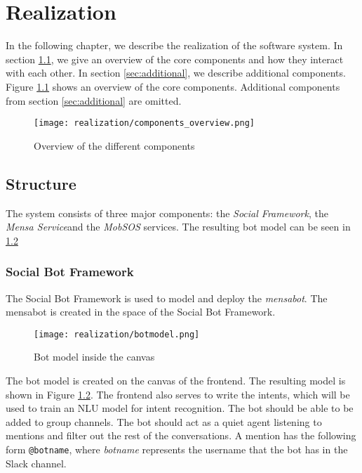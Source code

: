 \chapter{Realization}
In the following chapter, we describe the realization of the software system. In section \ref{sec:structure}, we give an overview of the core components and how they interact with each other. 
In section \ref{sec:additional}, we describe additional components. Figure \ref{fig:componentsOverview} shows an overview of the core components. Additional components from section \ref{sec:additional} are omitted.


\begin{figure}[h]
    \centering
    \texttt{[image: realization/components\_overview.png]}
    \caption{Overview of the different components}
    \label{fig:componentsOverview}
\end{figure}

\section{Structure}\label{sec:structure}
The system consists of three major components: the \emph{Social Framework}, the \emph{Mensa Service}\footnotemark and the \emph{MobSOS} services. 
The resulting bot model can be seen in \ref{fig:botmodel}
\subsection{Social Bot Framework}
The Social Bot Framework is used to model and deploy the \emph{mensabot}. The mensabot is created in the space of the Social Bot Framework.
\begin{figure}[h]
    \centering
    \texttt{[image: realization/botmodel.png]}
    \caption{Bot model inside the canvas}
    \label{fig:botmodel}
\end{figure}

The bot model is created on the canvas of the frontend. The resulting model is shown in Figure \ref{fig:botmodel}. The frontend also serves to write the intents, which will be used to train an NLU model for intent recognition. 
The bot should be able to be added to group channels. The bot should act as a quiet agent listening to mentions and filter out the rest of the conversations.
A mention has the following form \texttt{@botname}, where \emph{botname} represents the username that the bot has in the Slack channel.


